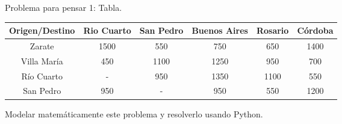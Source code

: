 \documentclass{beamer}
\begin{document}
\begin{frame}[fragile]{Problema para pensar 1: Tabla.}
  \begin{center}
    \begin{adjustbox}{width = 1.05 \textwidth}
        \begin{tabular}{|c|c|c|c|c|c|}
          \hline
          Origen/Destino & Rio Cuarto & San Pedro & Buenos Aires & Rosario & Córdoba \\
          \hline 
          Zarate      & 1500 & 550  & 750   & 650 & 1400 \\ 
          Villa María & 450  & 1100 & 1250  & 950 & 700 \\
          Río Cuarto  & -    & 950  & 1350  & 1100 & 550 \\
          San Pedro   & 950  &  -   & 950   & 550  & 1200 \\
           \hline
        \end{tabular}
    \end{adjustbox}
  \end{center}
  \alert{Modelar matemáticamente este problema y resolverlo usando Python.}
\end{frame}
\end{document}
